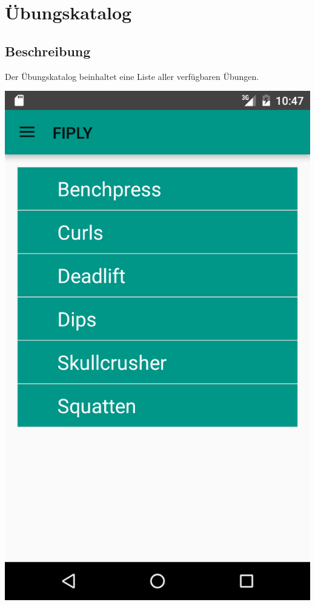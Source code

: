 \documentclass[FIPLY_base.tex]{subfiles}
\author{Gerald Irsiegler}
\date{26. Februar 2016}
\begin{document}
\section{Übungskatalog}

\subsection{Beschreibung}
Der Übungskatalog beinhaltet eine Liste aller verfügbaren Übungen.

\includegraphics[scale=0.4]{img/Uebungskatalog}
\end{document}
